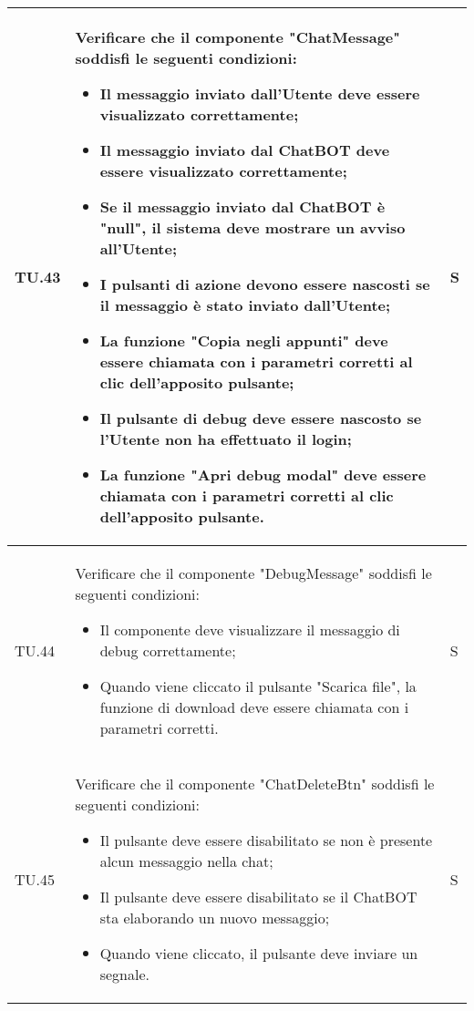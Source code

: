 \begin{adjustwidth}{-0.5cm}{-0.5cm}
\begin{longtable}{|P{1.5cm}|>{\raggedright}P{9.5cm}|>{\arraybackslash}P{1.5cm}|}
		\hline TU.43 & Verificare che il componente "ChatMessage" soddisfi le seguenti condizioni:
    \begin{itemize}
      \item Il messaggio inviato dall'Utente deve essere visualizzato correttamente;
			\item Il messaggio inviato dal ChatBOT deve essere visualizzato correttamente;
			\item Se il messaggio inviato dal ChatBOT è "null", il sistema deve mostrare un avviso all'Utente;
			\item I pulsanti di azione devono essere nascosti se il messaggio è stato inviato dall'Utente;
			\item La funzione "Copia negli appunti" deve essere chiamata con i parametri corretti al clic dell'apposito pulsante;
			\item Il pulsante di debug deve essere nascosto se l'Utente non ha effettuato il login;
			\item La funzione "Apri debug modal" deve essere chiamata con i parametri corretti al clic dell'apposito pulsante.
    \end{itemize} & S \\

		\hline TU.44 & Verificare che il componente "DebugMessage" soddisfi le seguenti condizioni:
    \begin{itemize}
      \item Il componente deve visualizzare il messaggio di debug correttamente;
			\item Quando viene cliccato il pulsante "Scarica file", la funzione di download deve essere chiamata con i parametri corretti.
    \end{itemize} & S \\

		\hline TU.45 & Verificare che il componente "ChatDeleteBtn" soddisfi le seguenti condizioni:
    \begin{itemize}
      \item Il pulsante deve essere disabilitato se non è presente alcun messaggio nella chat;
      \item Il pulsante deve essere disabilitato se il ChatBOT sta elaborando un nuovo messaggio;
      \item Quando viene cliccato, il pulsante deve inviare un segnale.
    \end{itemize} & S \\


\end{longtable}
\end{adjustwidth}
